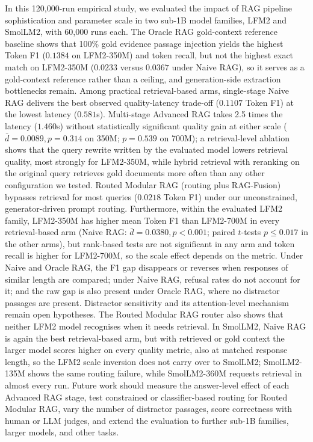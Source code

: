 \documentclass[10pt]{article}
\begin{document}
In this 120,000-run empirical study, we evaluated the impact of RAG pipeline sophistication and parameter scale in two sub-1B model families, LFM2 and SmolLM2, with 60,000 runs each. The Oracle RAG gold-context reference baseline shows that 100\% gold evidence passage injection yields the highest Token F1 ($0.1384$ on LFM2-350M) and token recall, but not the highest exact match on LFM2-350M ($0.0233$ versus $0.0367$ under Naive RAG), so it serves as a gold-context reference rather than a ceiling, and generation-side extraction bottlenecks remain. Among practical retrieval-based arms, single-stage Naive RAG delivers the best observed quality-latency trade-off ($0.1107$ Token F1) at the lowest latency ($0.581$s). Multi-stage Advanced RAG takes 2.5 times the latency ($1.460$s) without statistically significant quality gain at either scale ($\bar{d}=0.0089, p=0.314$ on 350M; $p=0.539$ on 700M); a retrieval-level ablation shows that the query rewrite written by the evaluated model lowers retrieval quality, most strongly for LFM2-350M, while hybrid retrieval with reranking on the original query retrieves gold documents more often than any other configuration we tested. Routed Modular RAG (routing plus RAG-Fusion) bypasses retrieval for most queries ($0.0218$ Token F1) under our unconstrained, generator-driven prompt routing. Furthermore, within the evaluated LFM2 family, LFM2-350M has higher mean Token F1 than LFM2-700M in every retrieval-based arm (Naive RAG: $\bar{d}=0.0380, p < 0.001$; paired $t$-tests $p \le 0.017$ in the other arms), but rank-based tests are not significant in any arm and token recall is higher for LFM2-700M, so the scale effect depends on the metric. Under Naive and Oracle RAG, the F1 gap disappears or reverses when responses of similar length are compared; under Naive RAG, refusal rates do not account for it; and the raw gap is also present under Oracle RAG, where no distractor passages are present. Distractor sensitivity and its attention-level mechanism remain open hypotheses. The Routed Modular RAG router also shows that neither LFM2 model recognises when it needs retrieval. In SmolLM2, Naive RAG is again the best retrieval-based arm, but with retrieved or gold context the larger model scores higher on every quality metric, also at matched response length, so the LFM2 scale inversion does not carry over to SmolLM2; SmolLM2-135M shows the same routing failure, while SmolLM2-360M requests retrieval in almost every run. Future work should measure the answer-level effect of each Advanced RAG stage, test constrained or classifier-based routing for Routed Modular RAG, vary the number of distractor passages, score correctness with human or LLM judges, and extend the evaluation to further sub-1B families, larger models, and other tasks.



\end{document}
